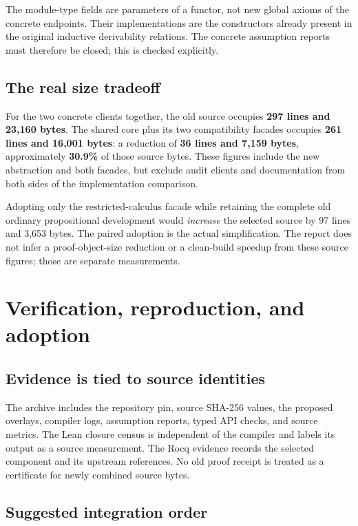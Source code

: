 \documentclass[11pt,letterpaper]{article}
\theoremstyle{definition}
\theoremstyle{remark}
\begin{document}
The module-type fields are parameters of a functor, not new global axioms of
the concrete endpoints. Their implementations are the constructors already
present in the original inductive derivability relations. The concrete
assumption reports must therefore be closed; this is checked explicitly.

\subsection{The real size tradeoff}

For the two concrete clients together, the old source occupies
\textbf{297 lines and 23,160 bytes}. The shared core plus its two compatibility
facades occupies \textbf{261 lines and 16,001 bytes}: a reduction of
\textbf{36 lines and 7,159 bytes}, approximately \textbf{30.9\%} of those source
bytes. These figures include the new abstraction and both facades, but exclude
audit clients and documentation from both sides of the implementation comparison.

Adopting only the restricted-calculus facade while retaining the complete old
ordinary propositional development would \emph{increase} the selected source by
97 lines and 3,653 bytes. The paired adoption is the actual simplification.
The report does not infer a proof-object-size reduction or a clean-build speedup
from these source figures; those are separate measurements.

\section{Verification, reproduction, and adoption}

\subsection{Evidence is tied to source identities}

The archive includes the repository pin, source SHA-256 values, the proposed
overlays, compiler logs, assumption reports, typed API checks, and source metrics.
The Lean closure census is independent of the compiler and labels its output as
a source measurement. The Rocq evidence records the selected component and its
upstream references. No old proof receipt is treated as a certificate for newly
combined source bytes.



\subsection{Suggested integration order}
\end{document}
